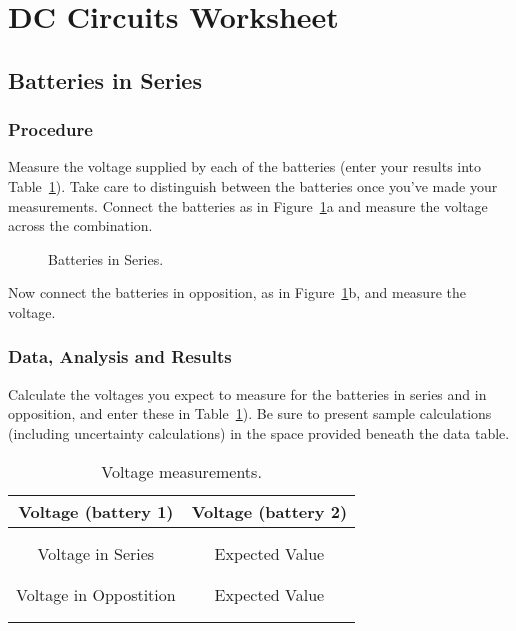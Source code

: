 \section{DC Circuits Worksheet}

\subsection{Batteries in Series}

\subsubsection{Procedure}

Measure the voltage supplied by each of the batteries (enter your results into 
Table~\ref{tab:DC:battseries}).  Take care to distinguish between the 
batteries once you've made your measurements. Connect the batteries as in 
Figure~\ref{fig:DC:procbatt}a and measure the voltage across the combination.  
\begin{figure}[htb]
\centerline{\epsfxsize=10cm }
\caption{Batteries in Series.}
\label{fig:DC:procbatt}
\end{figure}
Now connect the batteries in opposition, as in Figure~\ref{fig:DC:procbatt}b,
and measure the voltage.

\subsubsection{Data, Analysis and Results}
Calculate the voltages you expect to measure for the batteries in series and in
opposition, and enter these in Table~\ref{tab:DC:battseries}). Be sure to present
sample calculations (including uncertainty calculations) in the space provided
beneath the data table.
\newpage

\begin{table}[h]
\begin{center}
\begin{tabular}{|c|c|}
\hline
Voltage (battery 1) & Voltage (battery 2) \\ 
\hline
\hspace*{5cm} & \hspace*{5cm}\\
& \\
\hline
\hline
Voltage in Series & Expected Value \\
\hline
& \\
& \\
\hline
Voltage in Oppostition & Expected Value\\
\hline
& \\
& \\
\hline
\end{tabular}
\end{center}
\caption{Voltage measurements.}
\label{tab:DC:battseries}
\end{table}

